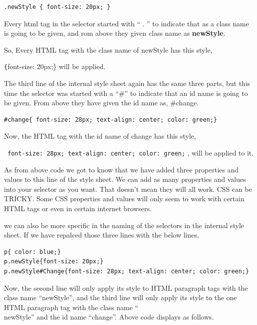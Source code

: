 \documentclass[11pt,a4paper]{article}
\begin{document}
\begin{verbatim}.newStyle { font-size: 20px; }\end{verbatim}

Every html tag in the selector started with `` . '' to indicate that as a class name is going to be given, and rom above they given class name as \textbf{newStyle}.

So, Every HTML tag with the class name of newStyle has this style,

\texttt\{font-size: 20px;\} will be applied.

The third line of the internal style sheet again has the same three parts, but this time the selector was started with a ``\#'' to indicate that an id name is going to be given. From above they have given the id name as, \#change.

\begin{verbatim}#change{ font-size: 28px; text-align: center; color: green;}\end{verbatim}

Now, the HTML tag with the id name of change has this style,

\texttt{ font-size: 28px; text-align: center; color: green;} , will be applied to it.

As from above code we got to know that we have added three properties and values to this line of the style sheet. We can add as many properties and values into your selector as you want. That doesn't mean they will all work. CSS can be TRICKY. Some CSS properties and values will only seem to work with certain HTML tags or even in certain internet browsers.

we can also be more specific in the naming of the selectors in the internal style sheet. If we have repalced those three lines with the below lines.
\begin{verbatim}
p{ color: blue;}
p.newStyle{font-size: 20px;}
p.newStyle#Change{font-size: 28px; text-align: center; color: green;}
\end{verbatim}
Now, the second line will only apply its style to HTML paragraph tags with the class name ``newStyle'', and the third line will only apply its style to the one HTML paragraph tag with the class name ``\\newStyle'' and the id name ``change''. Above code displays as follows.
\end{document}
